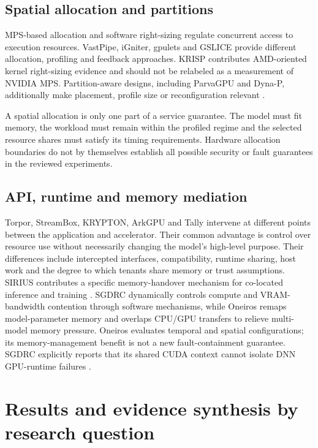 \subsection{Spatial allocation and partitions}
MPS-based allocation and software right-sizing regulate concurrent access to execution resources. VastPipe, iGniter, gpulets and GSLICE provide different allocation, profiling and feedback approaches. KRISP contributes AMD-oriented kernel right-sizing evidence and should not be relabeled as a measurement of NVIDIA MPS. Partition-aware designs, including ParvaGPU and Dyna-P, additionally make placement, profile size or reconfiguration relevant \cite{P001,P002,P003,P008,P011,P020,P021}.

A spatial allocation is only one part of a service guarantee. The model must fit memory, the workload must remain within the profiled regime and the selected resource shares must satisfy its timing requirements. Hardware allocation boundaries do not by themselves establish all possible security or fault guarantees in the reviewed experiments.

\subsection{API, runtime and memory mediation}
Torpor, StreamBox, KRYPTON, ArkGPU and Tally intervene at different points between the application and accelerator. Their common advantage is control over resource use without necessarily changing the model's high-level purpose. Their differences include intercepted interfaces, compatibility, runtime sharing, host work and the degree to which tenants share memory or trust assumptions. SIRIUS contributes a specific memory-handover mechanism for co-located inference and training \cite{P010,P012,P013,P014,P019,P022}.
SGDRC dynamically controls compute and VRAM-bandwidth contention through software mechanisms, while Oneiros remaps model-parameter memory and overlaps CPU/GPU transfers to relieve multi-model memory pressure. Oneiros evaluates temporal and spatial configurations; its memory-management benefit is not a new fault-containment guarantee. SGDRC explicitly reports that its shared CUDA context cannot isolate DNN GPU-runtime failures \cite{s024,s026}.



\section{Results and evidence synthesis by research question}
